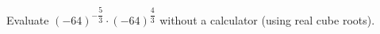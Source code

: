 Evaluate $(-64)^{-\dfrac{5}{3}}\cdot(-64)^{\dfrac{4}{3}}$ without a calculator (using real cube roots).
